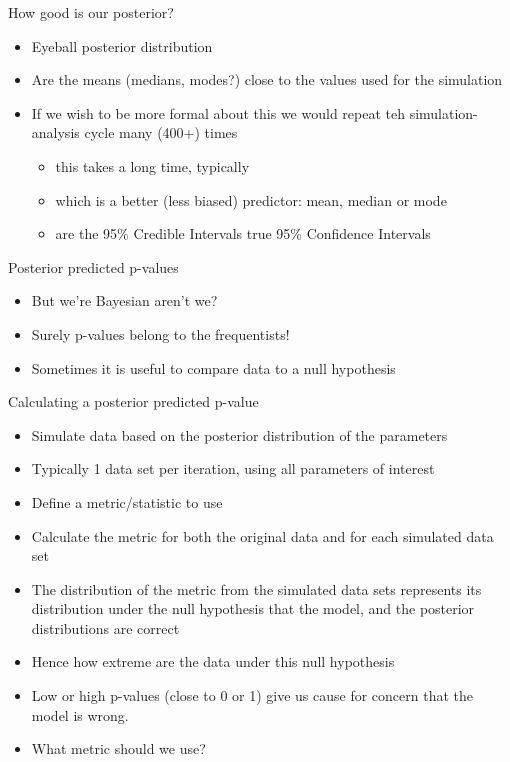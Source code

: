 \documentclass[
  ignorenonframetext,
]{beamer}
\providecommand{\tightlist}{%
  \setlength{\itemsep}{0pt}\setlength{\parskip}{0pt}}
\begin{document}
\begin{frame}{How good is our posterior?}
\protect\hypertarget{how-good-is-our-posterior}{}
\begin{itemize}
\tightlist
\item
  Eyeball posterior distribution
\item
  Are the means (medians, modes?) close to the values used for the
  simulation
\item
  If we wish to be more formal about this we would repeat teh
  simulation-analysis cycle many (400+) times

  \begin{itemize}
  \tightlist
  \item
    this takes a long time, typically
  \item
    which is a better (less biased) predictor: mean, median or mode
  \item
    are the 95\% Credible Intervals true 95\% Confidence Intervals
  \end{itemize}
\end{itemize}
\end{frame}

\begin{frame}{Posterior predicted p-values}
\protect\hypertarget{posterior-predicted-p-values}{}
\begin{itemize}
\tightlist
\item
  But we're Bayesian aren't we?
\item
  Surely p-values belong to the frequentists!
\item
  Sometimes it is useful to compare data to a null hypothesis
\end{itemize}
\end{frame}

\begin{frame}{Calculating a posterior predicted p-value}
\protect\hypertarget{calculating-a-posterior-predicted-p-value}{}
\begin{itemize}
\tightlist
\item
  Simulate data based on the posterior distribution of the parameters
\item
  Typically 1 data set per iteration, using all parameters of interest
\item
  Define a metric/statistic to use
\item
  Calculate the metric for both the original data and for each simulated
  data set
\item
  The distribution of the metric from the simulated data sets represents
  its distribution under the null hypothesis that the model, and the
  posterior distributions are correct
\item
  Hence how extreme are the data under this null hypothesis
\item
  Low or high p-values (close to 0 or 1) give us cause for concern that
  the model is wrong.
\item
  What metric should we use?
\end{itemize}
\end{frame}
\end{document}
